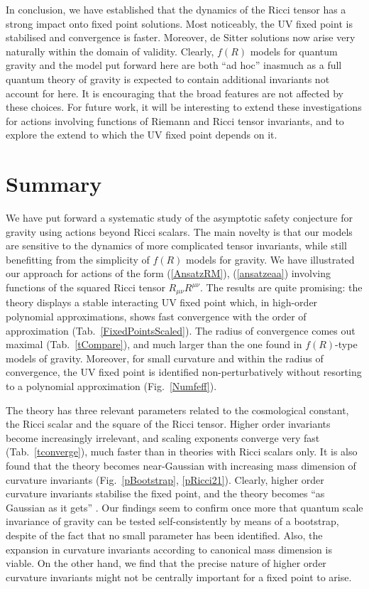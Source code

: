 \documentclass[notitlepage,eqsecnum,bm,amsmath,preprintnumbers,superscriptaddress,nofootinbib,aps,11pt]{revtex4-1}
\def\eq#1{(\ref{#1})}
\begin{document}
  
In conclusion, we have established that the dynamics of the Ricci tensor has a strong impact onto fixed point solutions. Most noticeably, the UV fixed point is stabilised and convergence is faster. Moreover, de Sitter solutions now arise very naturally within the domain of validity. Clearly, $f(R)$ models for quantum gravity and the model put forward here are both ``ad hoc'' inasmuch as a full quantum theory of gravity is expected to contain additional invariants not account for here. It is encouraging that the broad features are not affected by these choices. For future work, it will be interesting to extend these investigations 
for actions involving functions of Riemann and Ricci tensor invariants, and to explore the extend to which the UV fixed point depends on it.


\section{\bf Summary}
\label{sec:ConclusionsRM}


We have put forward a systematic study of the asymptotic safety conjecture for gravity using actions beyond Ricci scalars. The main novelty is that our models are sensitive to the dynamics of more complicated tensor  invariants, while still benefitting from the  simplicity of $f(R)$ models for gravity. 
We have illustrated our approach for actions of the form \eq{AnsatzRM}, \eq{ansatzeaa} involving functions of the squared Ricci tensor $R_{\mu\nu}R^{\mu\nu}$. The results are quite promising: the theory displays a stable interacting UV fixed point which, in high-order polynomial approximations, 
shows fast convergence with the order of approximation (Tab.~\ref{FixedPointsScaled}). The radius of convergence 
comes out maximal
(Tab.~\ref{tCompare}), and much larger than the one found in $f(R)$-type models of gravity. Moreover, for small curvature and within the radius of convergence, the UV fixed point is identified non-perturbatively without resorting to a polynomial approximation (Fig.~\ref{Numfeff}). 

The theory has three relevant parameters related to  the cosmological constant, the Ricci scalar and the square of the Ricci tensor. Higher order invariants become increasingly irrelevant, and scaling exponents converge very fast (Tab.~\ref{tconverge}), much faster than in theories with Ricci scalars only. It is also found that the theory becomes near-Gaussian with increasing mass dimension of curvature invariants (Fig.~\ref{pBootstrap}, \ref{pRicci21}). Clearly, higher order curvature invariants stabilise the fixed point, and the theory becomes ``as Gaussian as it gets'' \cite{Falls:2013bv,Falls:2014tra}.  
Our findings seem to confirm  once more that quantum scale invariance of gravity can be tested self-consistently by means of a bootstrap, despite of the fact that no small parameter has been identified. Also, the expansion in curvature invariants according to canonical mass dimension is viable. On the other hand, we find that the precise nature of higher order curvature  invariants might not be  centrally important for a fixed point to arise. 
\end{document}
